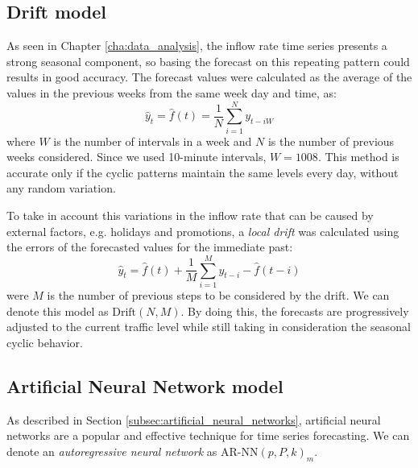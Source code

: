 \subsection{Drift model}
\label{subsec:drift_model}

As seen in Chapter \ref{cha:data_analysis}, the inflow rate time series presents a strong seasonal component, so basing the forecast on this repeating pattern could results in good accuracy. The forecast values were calculated as the average of the values in the previous weeks from the same week day and time, as:
\begin{equation}
  \hat{y}_t = \hat{f}(t) = \frac{1}{N} \sum_{i=1}^{N} y_{t-iW}
\end{equation}
where \( W \) is the number of intervals in a week and \( N \) is the number of previous weeks considered. Since we used 10-minute intervals, \( W = 1008 \). This method is accurate only if the cyclic patterns maintain the same levels every day, without any random variation.

To take in account this variations in the inflow rate that can be caused by external factors, e.g. holidays and promotions, a \emph{local drift} was calculated using the errors of the forecasted values for the immediate past:
\begin{equation}
  \hat{y}_t = \hat{f}(t) + \frac{1}{M} \sum_{i=1}^{M} y_{t-i} - \hat{f}(t-i)
\end{equation}
were \( M \) is the number of previous steps to be considered by the drift. We can denote this model as \( \text{Drift}(N, M) \). By doing this, the forecasts are progressively adjusted to the current traffic level while still taking in consideration the seasonal cyclic behavior.

\subsection{Artificial Neural Network model}
\label{subsec:artificial_neural_network_model}

As described in Section \ref{subsec:artificial_neural_networks}, artificial neural networks are a popular and effective technique for time series forecasting. We can denote an \emph{autoregressive neural network} as \( \text{AR-NN}(p, P, k)_m \).

